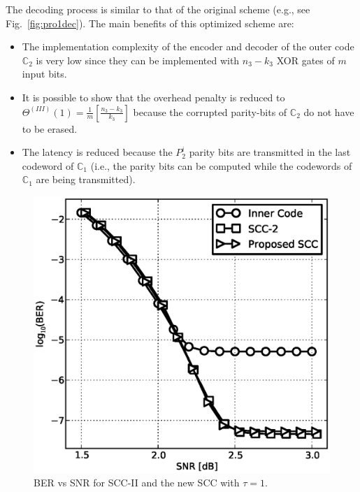 \documentclass[conference]{IEEEtran}
\newcommand{\C}{\mathbb{C}}  %
\newcommand{\ScaleA}{1.0} %
\begin{document}

The decoding process is similar to that of the original scheme (e.g.,
see Fig.~\ref{fig:pro1dec}). The main benefits of this optimized
scheme are:
\begin{itemize}
\item The implementation complexity of the encoder and decoder of the
  outer code $\C_2$ is very low since they can be implemented with
  $n_3-k_3$ XOR gates of $m$ input bits.
\item It is possible to show that the overhead penalty is reduced to
  $\Theta^{(I\!I\!I)}(1) =
  \frac{1}{m}\left[\frac{n_3-k_3}{k_3}\right]$ because the corrupted
  parity-bits of $\C_2$ do not have to be erased.
\item The latency is reduced because the $P_2^i$ parity bits are
  transmitted in the last codeword of $\C_1$ (i.e., the parity bits
  can be computed while the codewords of $\C_1$ are being transmitted).
\end{itemize}

\begin{figure}[t]
  \centerline{\includegraphics[width=\ScaleA\columnwidth]{figures_sources/BER_vs_SNR_Margulis_with_Scheme1.eps}}%
  \caption{BER vs SNR for SCC-II and the new SCC with $\tau=1$.}
    \label{fig:sim1}
\end{figure}
\end{document}
